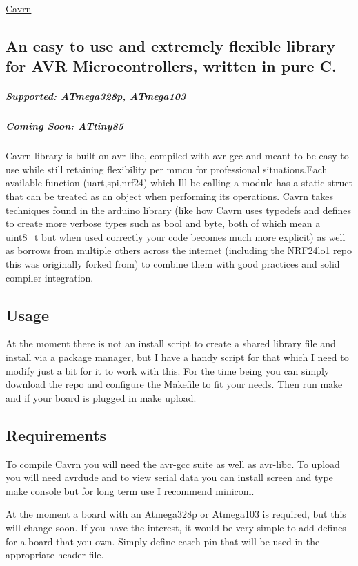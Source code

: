 \hyperlink{cavrn_8h_af129c0b3bc3584bd198babebfc7c3f69}{Cavrn} \subsection*{An easy to use and extremely flexible library for A\+V\+R Microcontrollers, written in pure C.}



 \subparagraph*{Supported\+: A\+Tmega328p, A\+Tmega103}

\subparagraph*{Coming Soon\+: A\+Ttiny85}

Cavrn library is built on avr-\/libc, compiled with avr-\/gcc and meant to be easy to use while still retaining flexibility per mmcu for professional situations.\+Each available function (uart,spi,nrf24) which I\textquotesingle{}ll be calling a module has a static struct that can be treated as an object when performing its operations. Cavrn takes techniques found in the arduino library (like how Cavrn uses typedefs and defines to create more verbose types such as bool and byte, both of which mean a uint8\+\_\+t but when used correctly your code becomes much more explicit) as well as borrows from multiple others across the internet (including the N\+R\+F24lo1 repo this was originally forked from) to combine them with good practices and solid compiler integration.

\subsection*{Usage}

At the moment there is not an install script to create a shared library file and install via a package manager, but I have a handy script for that which I need to modify just a bit for it to work with this. For the time being you can simply download the repo and configure the {\ttfamily Makefile} to fit your needs. Then run {\ttfamily make} and if your board is plugged in {\ttfamily make upload}.

\subsection*{Requirements}

To compile Cavrn you will need the avr-\/gcc suite as well as avr-\/libc. To upload you will need avrdude and to view serial data you can install screen and type {\ttfamily make console} but for long term use I recommend minicom.

At the moment a board with an Atmega328p or Atmega103 is required, but this will change soon. If you have the interest, it would be very simple to add defines for a board that you own. Simply define easch pin that will be used in the appropriate header file.



